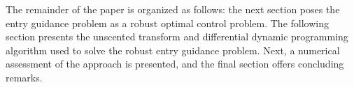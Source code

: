 \documentclass[journal ]{new-aiaa}
\begin{document}



The remainder of the paper is organized as follows: the next section poses the entry guidance problem as a robust optimal control problem. The following section presents the unscented transform and differential dynamic programming algorithm used to solve the robust entry guidance problem. Next, a numerical assessment of the approach is presented, and the final section offers concluding remarks. 
\end{document}
